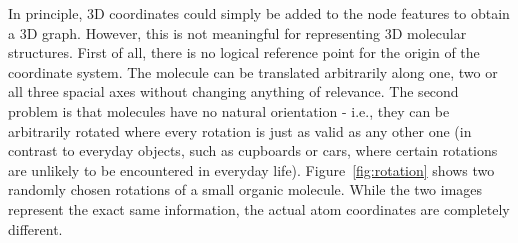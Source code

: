 In principle, 3D coordinates could simply be added to the node features to obtain a 3D graph. However, this is not meaningful for representing 3D molecular structures. First of all, there is no logical reference point for the origin of the coordinate system. The molecule can be translated arbitrarily along one, two or all three spacial axes without changing anything of relevance. The second problem is that molecules have no natural orientation - i.e., they can be arbitrarily rotated where every rotation is just as valid as any other one (in contrast to everyday objects, such as cupboards or cars, where certain rotations are unlikely to be encountered in everyday life). Figure~\ref{fig:rotation} shows two randomly chosen rotations of a small organic molecule. While the two images represent the exact same information, the actual atom coordinates are completely different.

